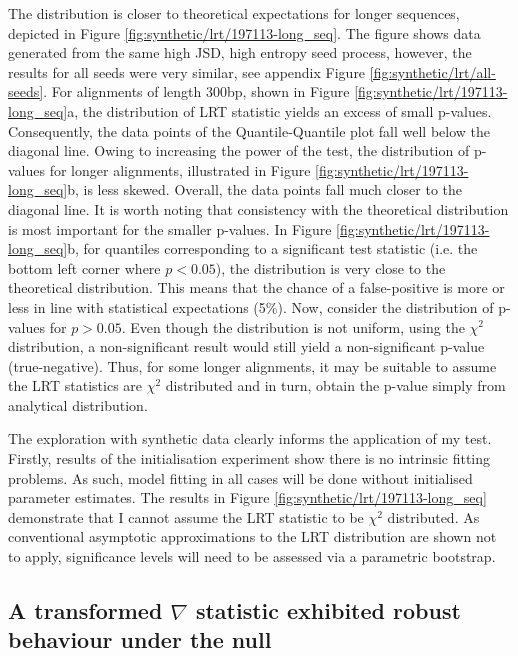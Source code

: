 The distribution is closer to theoretical expectations for longer sequences, depicted in Figure \ref{fig:synthetic/lrt/197113-long_seq}. The figure shows data generated from the same high JSD, high entropy seed process, however, the results for all seeds were very similar, see appendix Figure \ref{fig:synthetic/lrt/all-seeds}. For alignments of length 300bp, shown in Figure \ref{fig:synthetic/lrt/197113-long_seq}a, the distribution of LRT statistic yields an excess of small p-values. Consequently, the data points of the Quantile-Quantile plot fall well below the diagonal line. Owing to increasing the power of the test, the distribution of p-values for longer alignments, illustrated in Figure \ref{fig:synthetic/lrt/197113-long_seq}b, is less skewed. Overall, the data points fall much closer to the diagonal line. It is worth noting that consistency with the theoretical distribution is most important for the smaller p-values. In Figure \ref{fig:synthetic/lrt/197113-long_seq}b, for quantiles corresponding to a significant test statistic (i.e. the bottom left corner where $p<0.05$), the distribution is very close to the theoretical distribution. This means that the chance of a false-positive is more or less in line with statistical expectations (5\%). Now, consider the distribution of p-values for $p>0.05$. Even though the distribution is not uniform, using the $\chi^{2}$ distribution, a non-significant result would still yield a non-significant p-value (true-negative). Thus, for some longer alignments, it may be suitable to assume the LRT statistics are $\chi^{2}$ distributed and in turn, obtain the p-value simply from analytical distribution. 



The exploration with synthetic data clearly informs the application of my test. Firstly, results of the initialisation experiment show there is no intrinsic fitting problems. As such, model fitting in all cases will be done without initialised parameter estimates. The results in Figure \ref{fig:synthetic/lrt/197113-long_seq} demonstrate that I cannot assume the LRT statistic to be $\chi^{2}$ distributed. As conventional asymptotic approximations to the LRT distribution are shown not to apply, significance levels will need to be assessed via a parametric bootstrap. 

\subsection*{A transformed $\nabla$ statistic exhibited robust behaviour under the null}

